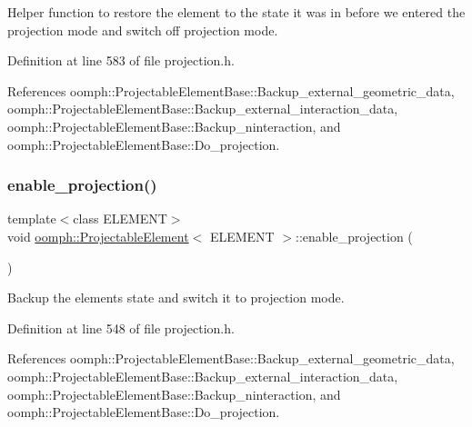Helper function to restore the element to the state it was in before we entered the projection mode and switch off projection mode. 



Definition at line 583 of file projection.\+h.



References oomph\+::\+Projectable\+Element\+Base\+::\+Backup\+\_\+external\+\_\+geometric\+\_\+data, oomph\+::\+Projectable\+Element\+Base\+::\+Backup\+\_\+external\+\_\+interaction\+\_\+data, oomph\+::\+Projectable\+Element\+Base\+::\+Backup\+\_\+ninteraction, and oomph\+::\+Projectable\+Element\+Base\+::\+Do\+\_\+projection.

\mbox{\label{classoomph_1_1ProjectableElement_a08968691986cf6dbe45e5c20d46e46be}} 
\subsubsection{\texorpdfstring{enable\+\_\+projection()}{enable\_projection()}}
{\footnotesize\ttfamily template$<$class E\+L\+E\+M\+E\+NT$>$ \\
void \hyperlink{classoomph_1_1ProjectableElement}{oomph\+::\+Projectable\+Element}$<$ E\+L\+E\+M\+E\+NT $>$\+::enable\+\_\+projection (\begin{DoxyParamCaption}{ }\end{DoxyParamCaption})\hspace{0.3cm}{\ttfamily [inline]}}



Backup the element\textquotesingle{}s state and switch it to projection mode. 



Definition at line 548 of file projection.\+h.



References oomph\+::\+Projectable\+Element\+Base\+::\+Backup\+\_\+external\+\_\+geometric\+\_\+data, oomph\+::\+Projectable\+Element\+Base\+::\+Backup\+\_\+external\+\_\+interaction\+\_\+data, oomph\+::\+Projectable\+Element\+Base\+::\+Backup\+\_\+ninteraction, and oomph\+::\+Projectable\+Element\+Base\+::\+Do\+\_\+projection.

\mbox{\label{classoomph_1_1ProjectableElement_a5b6894eda403bd2b9d2cf1e0314d7a23}} 
